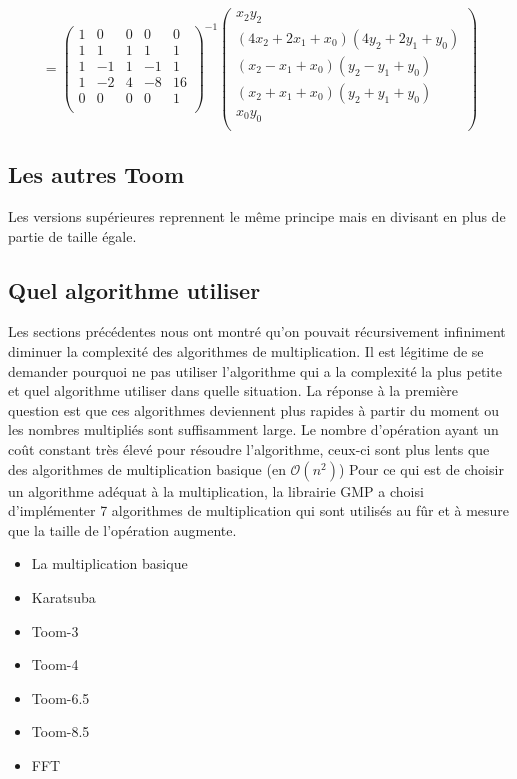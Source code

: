 \documentclass[letterpaper]{article}
\begin{document}
$$
=
\begin{pmatrix}
  1 & 0 & 0 & 0 & 0 \\
  1 & 1 & 1 & 1 & 1 \\
  1 &-1 & 1 &-1 & 1 \\
  1 &-2 & 4 &-8 &16 \\
  0 & 0 & 0 & 0 & 1 \\
\end{pmatrix}^{-1}
\begin{pmatrix}
  x_2y_2 \\
  (4x_2 + 2x_1 + x_0) (4y_2+ 2y_1 + y_0)\\
  (x_2 - x_1 + x_0) (y_2 - y_1 + y_0)\\
  (x_2 + x_1 + x_0) (y_2 + y_1 + y_0)\\
  x_0y_0\\
\end{pmatrix}
$$

\subsection{Les autres Toom}

Les versions supérieures reprennent le même principe mais en divisant
en plus de partie de taille égale.

\subsection{Quel algorithme utiliser}

Les sections précédentes nous ont montré qu'on pouvait récursivement
infiniment diminuer la complexité des algorithmes de multiplication.
Il est légitime de se demander pourquoi ne pas utiliser l'algorithme
qui a la complexité la plus petite et quel algorithme utiliser dans
quelle situation.
\newline
La réponse à la première question est que ces algorithmes deviennent
plus rapides à partir du moment ou les nombres multipliés sont
suffisamment large. Le nombre d'opération ayant un coût constant
très élevé pour résoudre l'algorithme, ceux-ci sont plus lents
que des algorithmes de multiplication basique (en $\mathcal{O}(n^2)$)
\newline
Pour ce qui est de choisir un algorithme adéquat à la multiplication,
la librairie GMP a choisi d'implémenter 7 algorithmes de multiplication
qui sont utilisés au fûr et à mesure que la taille de l'opération
augmente\cite{gmplibmultiplication}.

\begin{itemize}
  \item La multiplication basique
  \item Karatsuba
  \item Toom-3
  \item Toom-4
  \item Toom-6.5
  \item Toom-8.5
  \item FFT
\end{itemize}
\end{document}
